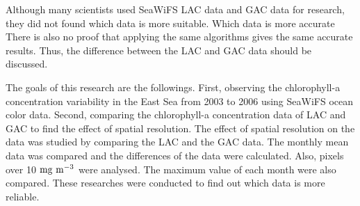 Although many scientists used SeaWiFS LAC data and GAC data for research, they did not found which data is more suitable. Which data is more accurate There is also no proof that applying the same algorithms gives the same accurate results. Thus, the difference between the LAC and GAC data should be discussed. 

The goals of this research are the followings. First, observing the chlorophyll-a concentration variability in the East Sea from 2003 to 2006 using SeaWiFS ocean color data. Second, comparing the chlorophyll-a concentration data of LAC and GAC to find the effect of spatial resolution. The effect of spatial resolution on the data was studied by comparing the LAC and the GAC data. The monthly mean data was compared and the differences of the data were calculated. Also, pixels over 10 $\rm mg~m^{-3}$ were analysed. The maximum value of each month were also compared. These researches were conducted to find out which data is more reliable.
